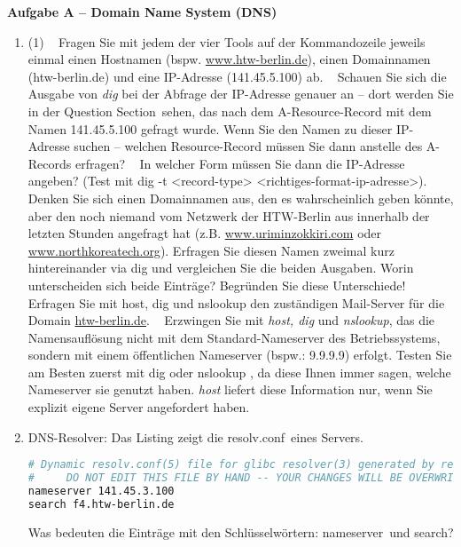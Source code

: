 \documentclass[paper=a4,fontsize=11pt]{scrartcl}%
\numberwithin{equation}{section}
\begin{document}
\begin{center}\Large{\textbf{Aufgabe A -- Domain Name System (DNS)}}\end{center}\vskip0.25in
\begin{enumerate}
	\item
\begin{tasks}(1)
		\task~ Fragen Sie mit jedem der vier Tools auf der Kommandozeile jeweils einmal einen Hostnamen (bspw. \url{www.htw-berlin.de}), einen Domainnamen (htw-berlin.de) und eine IP-Adresse (141.45.5.100) ab.
		\task~ Schauen Sie sich die Ausgabe von \emph{dig} bei der Abfrage der IP-Adresse genauer an -- dort werden Sie in der \glqq Question Section\grqq\ sehen, das nach dem A-Resource-Record mit dem Namen 141.45.5.100 gefragt wurde. Wenn Sie den Namen zu dieser IP-Adresse suchen -- welchen Resource-Record müssen Sie dann anstelle des A-Records erfragen? 
		\task~ In welcher Form müssen Sie dann die IP-Adresse angeben? (Test mit dig -t <record-type> <richtiges-format-ip-adresse>).
		\task~ Denken Sie sich einen Domainnamen aus, den es wahrscheinlich geben könnte, aber den noch niemand vom Netzwerk der HTW-Berlin aus innerhalb der letzten Stunden angefragt hat (z.B. \url{www.uriminzokkiri.com} oder \url{www.northkoreatech.org}). Erfragen Sie diesen Namen zweimal kurz hintereinander via dig und vergleichen Sie die beiden Ausgaben. Worin unterscheiden sich beide Einträge? Begründen Sie diese Unterschiede!
		\task~ Erfragen Sie mit host, dig und nslookup den zuständigen Mail-Server für die Domain \url{htw-berlin.de}.
		\task~ Erzwingen Sie mit \emph{host, dig} und \emph{nslookup}, das die Namensauflösung nicht mit dem Standard-Nameserver des Betriebssystems, sondern mit einem öffentlichen Nameserver (bspw.: 9.9.9.9) erfolgt. Testen Sie am Besten zuerst mit dig oder nslookup , da diese Ihnen immer sagen, welche Nameserver sie genutzt haben. \emph{host} liefert diese Information nur, wenn Sie explizit eigene Server angefordert haben.
	\end{tasks}
	\item DNS-Resolver: Das Listing zeigt die \glqq resolv.conf\grqq\ eines Servers. 
	\begin{lstlisting}[style=Bash, language=Bash]
# Dynamic resolv.conf(5) file for glibc resolver(3) generated by resolvconf(8)
#     DO NOT EDIT THIS FILE BY HAND -- YOUR CHANGES WILL BE OVERWRITTEN
nameserver 141.45.3.100
search f4.htw-berlin.de
\end{lstlisting} \label{dns}
Was bedeuten die Einträge mit den Schlüsselwörtern: \glqq nameserver\grqq\ und \glqq search\grqq ?
\end{enumerate}
\end{document}
